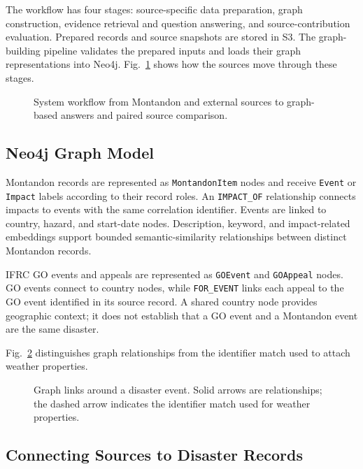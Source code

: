 \documentclass[journal]{IEEEtran}
\begin{document}
The workflow has four stages: source-specific data preparation, graph
construction, evidence retrieval and question answering, and
source-contribution evaluation. Prepared records and source
snapshots are stored in S3. The graph-building pipeline validates the
prepared inputs and loads their graph representations into Neo4j.
Fig.~\ref{fig:pipeline} shows how the sources move through these stages.

\begin{figure}[!t]
    \centering
    
    \caption{System workflow from Montandon and external sources to
    graph-based answers and paired source comparison.}
    \label{fig:pipeline}
\end{figure}

\subsection{Neo4j Graph Model}

Montandon records are represented as \texttt{MontandonItem} nodes and
receive \texttt{Event} or \texttt{Impact} labels according to their
record roles. An \texttt{IMPACT\_OF} relationship connects impacts to
events with the same correlation identifier. Events are linked to
country, hazard, and start-date nodes. Description, keyword, and
impact-related embeddings support bounded semantic-similarity
relationships between distinct Montandon records.

IFRC GO events and appeals are represented as \texttt{GOEvent} and
\texttt{GOAppeal} nodes. GO events connect to country nodes, while
\texttt{FOR\_EVENT} links each appeal to the GO event identified in
its source record. A shared country node provides geographic context;
it does not establish that a GO event and a Montandon event are the
same disaster.

Fig.~\ref{fig:graph} distinguishes graph relationships from the
identifier match used to attach weather properties.

\begin{figure}[!t]
    \centering
    
    \caption{Graph links around a disaster event. Solid arrows are
    relationships; the dashed arrow indicates the identifier match
    used for weather properties.}
    \label{fig:graph}
\end{figure}

\subsection{Connecting Sources to Disaster Records}
\end{document}

